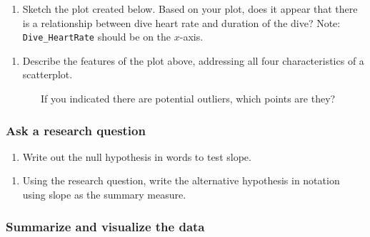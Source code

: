 \documentclass[
]{report}
\providecommand{\tightlist}{%
  \setlength{\itemsep}{0pt}\setlength{\parskip}{0pt}}
\begin{document}
\begin{enumerate}
\def\labelenumi{\arabic{enumi}.}
\setcounter{enumi}{1}
\tightlist
\item
  Sketch the plot created below. Based on your plot, does it appear that there is a relationship between dive heart rate and duration of the dive? Note: \texttt{Dive\_HeartRate} should be on the \(x\)-axis.
\end{enumerate}

\vspace{2in}

\begin{enumerate}
\def\labelenumi{\arabic{enumi}.}
\setcounter{enumi}{2}
\tightlist
\item
  Describe the features of the plot above, addressing all four characteristics of a scatterplot.
\end{enumerate}

\vspace{1in}

~~~~~~~If you indicated there are potential outliers, which points are they?

\vspace{0.5in}

\hypertarget{ask-a-research-question-5}{%
\subsubsection*{Ask a research question}\label{ask-a-research-question-5}}

\begin{enumerate}
\def\labelenumi{\arabic{enumi}.}
\setcounter{enumi}{3}
\tightlist
\item
  Write out the null hypothesis in words to test slope.
\end{enumerate}

\vspace{1in}

\begin{enumerate}
\def\labelenumi{\arabic{enumi}.}
\setcounter{enumi}{4}
\tightlist
\item
  Using the research question, write the alternative hypothesis in notation using slope as the summary measure.
\end{enumerate}

\vspace{0.5in}

\hypertarget{summarize-and-visualize-the-data-5}{%
\subsubsection*{Summarize and visualize the data}\label{summarize-and-visualize-the-data-5}}
\end{document}
